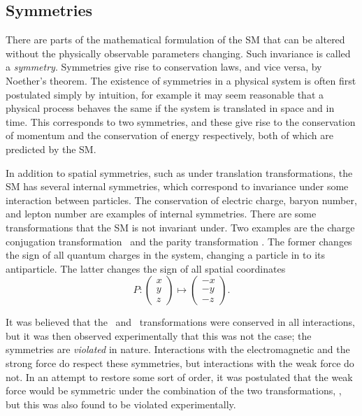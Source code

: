 \subsection{Symmetries}

There are parts of the mathematical formulation of the \ac{SM} that can be 
altered without the physically observable parameters changing.
Such invariance is called a \emph{symmetry}.
Symmetries give rise to conservation laws, and vice versa, by Noether's 
theorem.
The existence of symmetries in a physical system is often first postulated 
simply by intuition, for example it may seem reasonable that a physical process 
behaves the same if the system is translated in space and in time.
This corresponds to two symmetries, and these give rise to the conservation of 
momentum and the conservation of energy respectively, both of which are 
predicted by the \ac{SM}.

In addition to spatial symmetries, such as under translation transformations, 
the \ac{SM} has several internal symmetries, which correspond to invariance 
under some interaction between particles.
The conservation of electric charge, baryon number, and lepton number are 
examples of internal symmetries.
There are some transformations that the \ac{SM} is not invariant under.
Two examples are the charge conjugation transformation \Ctransform\ and the 
parity transformation \Ptransform.
The former changes the sign of all quantum charges in the system, changing a 
particle in to its antiparticle.
The latter changes the sign of all spatial coordinates
\begin{equation}
  P: \begin{pmatrix}x\\y\\z\end{pmatrix}
     \mapsto \begin{pmatrix}-x\\-y\\-z\end{pmatrix}.
  \label{eqn:intro:sm:parity}
\end{equation}

It was believed that the \Ctransform\ and \Ptransform\ transformations were 
conserved in all interactions, but it was then observed experimentally that 
this was not the case; the symmetries are \emph{violated} in nature.
Interactions with the electromagnetic and the strong force do respect these 
symmetries, but interactions with the weak force do not.
In an attempt to restore some sort of order, it was postulated that the weak 
force would be symmetric under the combination of the two transformations, \CP, 
but this was also found to be violated experimentally.

